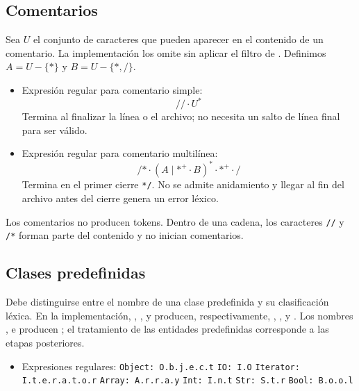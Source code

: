
\subsection{Comentarios}
Sea $U$ el conjunto de caracteres que pueden aparecer en el contenido de un
comentario. La implementación los omite sin aplicar el filtro de
. Definimos $A=U-\{\texttt{*}\}$ y $B=U-\{\texttt{*},\texttt{/}\}$.
\begin{itemize}[leftmargin=*]
  \item Expresión regular para comentario simple:
  \[
  \texttt{//}\cdot U^*
  \]
  Termina al finalizar la línea o el archivo; no necesita un salto de línea
  final para ser válido.
  \item Expresión regular para comentario multilínea:
  \[
  \texttt{/*}\cdot
  (A\mid\texttt{*}^{+}\cdot B)^*\cdot
  \texttt{*}^{+}\cdot\texttt{/}
  \]
  Termina en el primer cierre \verb~*/~. No se admite anidamiento y llegar
  al fin del archivo antes del cierre genera un error léxico.
\end{itemize}
Los comentarios no producen tokens. Dentro de una cadena, los caracteres
\verb~//~ y \verb~/*~ forman parte del contenido y no inician comentarios.


\subsection{Clases predefinidas}
Debe distinguirse entre el nombre de una clase predefinida y su clasificación
léxica. En la implementación, , , 
y  producen, respectivamente, ,
,  y .
Los nombres ,  e  producen
; el tratamiento de las entidades predefinidas
corresponde a las etapas posteriores.
\begin{itemize}[leftmargin=*]
  \item Expresiones regulares:
  \subitem \verb~Object: O.b.j.e.c.t~
  \subitem \verb~IO: I.O~
  \subitem \verb~Iterator: I.t.e.r.a.t.o.r~
  \subitem \verb~Array: A.r.r.a.y~
  \subitem \verb~Int: I.n.t~
  \subitem \verb~Str: S.t.r~
  \subitem \verb~Bool: B.o.o.l~
\end{itemize}


